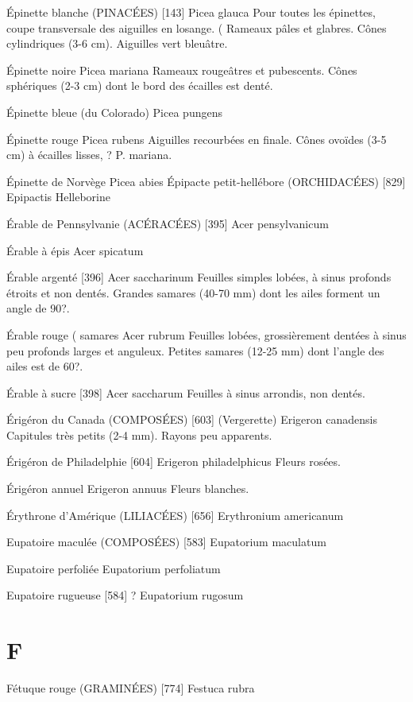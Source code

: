 Épinette blanche (PINACÉES)  [143]
				Picea glauca
Pour toutes les épinettes, coupe transversale des aiguilles en losange. (
Rameaux pâles et glabres. Cônes cylindriques (3-6 cm).
Aiguilles vert bleuâtre.

Épinette noire
				Picea mariana
Rameaux rougeâtres et pubescents.
Cônes sphériques (2-3 cm) dont le bord des écailles est denté.

Épinette bleue (du Colorado)
				Picea pungens

Épinette rouge
				Picea rubens
Aiguilles recourbées en finale.
Cônes ovoïdes (3-5 cm) à écailles lisses, ? P. mariana.

Épinette de Norvège
				Picea abies
Épipacte petit-hellébore (ORCHIDACÉES)  [829]
				Epipactis Helleborine

Érable de Pennsylvanie (ACÉRACÉES)  [395]
				Acer pensylvanicum

Érable à épis
				Acer spicatum

Érable argenté  [396]
				Acer saccharinum
Feuilles simples lobées, à sinus profonds étroits et non dentés.
Grandes samares (40-70 mm) dont les ailes forment un angle de 90?.

Érable rouge							( samares
				Acer rubrum
Feuilles lobées, grossièrement dentées à sinus peu profonds larges et anguleux.
Petites samares (12-25 mm) dont l’angle des ailes est de 60?.

Érable à sucre  [398]
				Acer saccharum
Feuilles à sinus arrondis, non dentés.


Érigéron du Canada (COMPOSÉES)  [603] (Vergerette)
				Erigeron canadensis
Capitules très petits (2-4 mm). Rayons peu apparents.

Érigéron de Philadelphie  [604]
				Erigeron philadelphicus
Fleurs rosées.

Érigéron annuel
				Erigeron annuus
Fleurs blanches.

Érythrone d’Amérique (LILIACÉES)  [656]
				Erythronium americanum

Eupatoire maculée (COMPOSÉES)  [583]
				Eupatorium maculatum

Eupatoire perfoliée
				Eupatorium perfoliatum

Eupatoire rugueuse  [584]							?
				Eupatorium rugosum

\chapter*{F}

Fétuque rouge (GRAMINÉES)  [774]
				Festuca rubra

